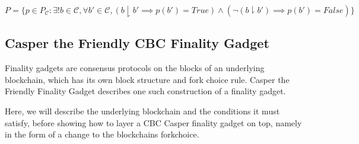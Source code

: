 \begin{defn}
$$
P = \{p \in P_{\mathcal{C}} : \exists! b \in \mathcal{C}, \forall b' \in \mathcal{C}, (b \downharpoonright b' \implies p(b') = True) \land (\neg(b \downharpoonright b') \implies p(b') = False)\}
$$
\end{defn}


\iffalse
\begin{thm}
$\forall p \in P$,
$$
Max\_Weight(p)
$$
\end{thm}
\fi



\subsection{Casper the Friendly CBC Finality Gadget}

Finality gadgets are consensus protocols on the blocks of an underlying blockchain, which has its own block structure and fork choice rule. Casper the Friendly Finality Gadget\cite{vitalik2017casperffg} describes one such construction of a finality gadget.

Here, we will describe the underlying blockchain and the conditions it must satisfy, before showing how to layer a CBC Casper finality gadget on top, namely in the form of a change to the blockchains forkchoice.

